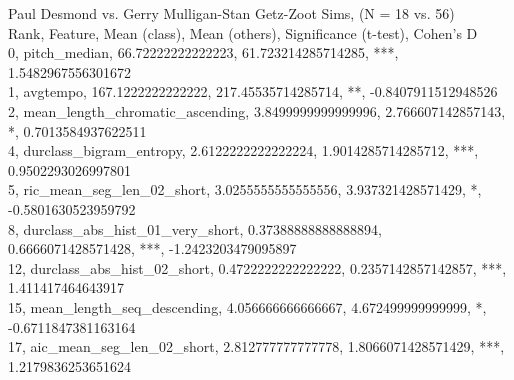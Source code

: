 Paul Desmond vs. Gerry Mulligan-Stan Getz-Zoot Sims, (N = 18 vs. 56)\\
Rank, Feature, Mean (class), Mean (others), Significance (t-test), Cohen's D\\
0, pitch_median, 66.72222222222223, 61.723214285714285, ***, 1.5482967556301672\\
1, avgtempo, 167.1222222222222, 217.45535714285714, **, -0.8407911512948526\\
2, mean_length_chromatic_ascending, 3.8499999999999996, 2.766607142857143, *, 0.7013584937622511\\
4, durclass_bigram_entropy, 2.6122222222222224, 1.9014285714285712, ***, 0.9502293026997801\\
5, ric_mean_seg_len_02_short, 3.0255555555555556, 3.937321428571429, *, -0.5801630523959792\\
8, durclass_abs_hist_01_very_short, 0.37388888888888894, 0.6666071428571428, ***, -1.2423203479095897\\
12, durclass_abs_hist_02_short, 0.4722222222222222, 0.2357142857142857, ***, 1.411417464643917\\
15, mean_length_seq_descending, 4.056666666666667, 4.672499999999999, *, -0.6711847381163164\\
17, aic_mean_seg_len_02_short, 2.812777777777778, 1.8066071428571429, ***, 1.2179836253651624\\
